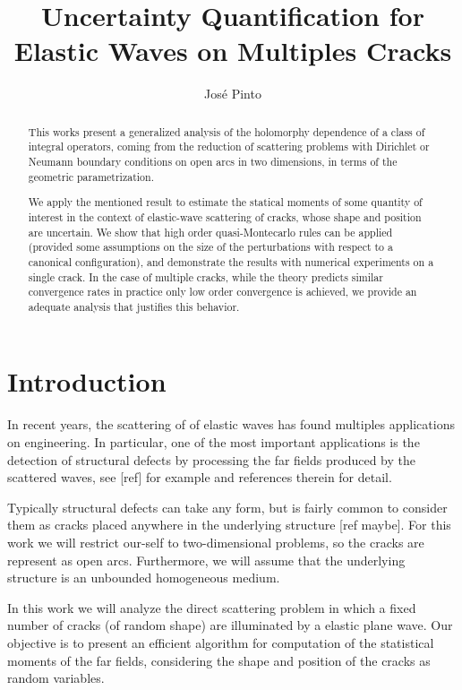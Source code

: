 \documentclass{article}
\title{Uncertainty Quantification for Elastic Waves on Multiples Cracks}
\author{Jos\'e Pinto}
\newcommand{\todo}[1]{{\color{red}[#1]}}
\begin{document}
\maketitle

\begin{abstract}
This works present a generalized analysis of the holomorphy dependence of a class of integral operators, coming from the reduction of scattering problems with Dirichlet or Neumann boundary conditions on open arcs in two dimensions,  in terms of the geometric parametrization. 

We apply the mentioned result to estimate the statical moments of some quantity of interest in the context of elastic-wave scattering of cracks, whose shape and position are uncertain. We show that high order quasi-Montecarlo rules can be applied (provided some assumptions on the size of the perturbations with respect to a canonical configuration), and demonstrate the results with numerical experiments on a single crack. In the case of multiple cracks, while the theory predicts similar convergence rates in practice only low order convergence is achieved, we provide an adequate analysis that justifies this behavior. 
\end{abstract}

\section{Introduction}
In recent years, the scattering of of elastic waves has found multiples applications on engineering. 
In particular, one of the most important applications is the detection of structural defects by processing the far fields produced by the scattered waves, see  \todo{ref} for example and references therein for detail.

Typically structural defects can take any form, but is fairly common to consider them as cracks placed anywhere in the underlying structure \todo{ref maybe}. For this work we will restrict our-self to two-dimensional problems, so the cracks are represent as open arcs. Furthermore, we will assume that the underlying structure is an unbounded homogeneous medium. 

In this work we will analyze the direct scattering problem in which a fixed number of cracks (of random shape) are illuminated by a elastic plane wave. Our objective is to present an efficient algorithm for  computation of the statistical moments of the far fields, considering the shape and position of the cracks as random variables. 
\end{document}
